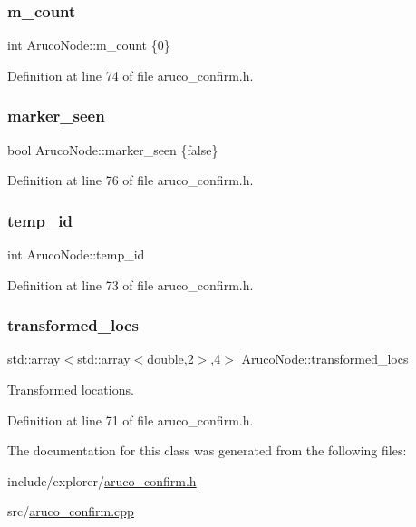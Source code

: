 \subsubsection{\texorpdfstring{m\+\_\+count}{m\_count}}
{\footnotesize\ttfamily int Aruco\+Node\+::m\+\_\+count \{0\}}



Definition at line 74 of file aruco\+\_\+confirm.\+h.

\mbox{\label{class_aruco_node_a21fe489a4ab6a73e807e74a5c1de466d}} 
\subsubsection{\texorpdfstring{marker\+\_\+seen}{marker\_seen}}
{\footnotesize\ttfamily bool Aruco\+Node\+::marker\+\_\+seen \{false\}}



Definition at line 76 of file aruco\+\_\+confirm.\+h.

\mbox{\label{class_aruco_node_ac9561321e855855ccc8f643cc139a638}} 
\subsubsection{\texorpdfstring{temp\+\_\+id}{temp\_id}}
{\footnotesize\ttfamily int Aruco\+Node\+::temp\+\_\+id}



Definition at line 73 of file aruco\+\_\+confirm.\+h.

\mbox{\label{class_aruco_node_ab410bc0b655071ee67e7ba63b4edf256}} 
\subsubsection{\texorpdfstring{transformed\+\_\+locs}{transformed\_locs}}
{\footnotesize\ttfamily std\+::array$<$std\+::array$<$double,2$>$,4$>$ Aruco\+Node\+::transformed\+\_\+locs}



Transformed locations. 



Definition at line 71 of file aruco\+\_\+confirm.\+h.



The documentation for this class was generated from the following files\+:\begin{DoxyCompactItemize}
\item 
include/explorer/\hyperlink{aruco__confirm_8h}{aruco\+\_\+confirm.\+h}\item 
src/\hyperlink{aruco__confirm_8cpp}{aruco\+\_\+confirm.\+cpp}\end{DoxyCompactItemize}
